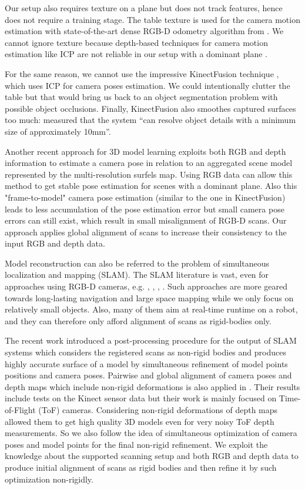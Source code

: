 \documentclass[letterpaper, 10 pt, conference]{ieeeconf}  %
\begin{document}
Our setup also requires 
texture on a plane but does not track features, hence does not require a training stage.
The table texture is used for the camera motion estimation 
with state-of-the-art dense RGB-D odometry algorithm from \cite{steinbrucker2011real}.
We cannot ignore texture because depth-based
techniques for camera motion estimation like ICP \cite{besl1992method} 
are not reliable in our setup with a dominant plane \cite{rusinkiewicz2001efficient}.


For the same reason, we cannot use
the impressive KinectFusion technique \cite{newcombe2011kinectfusion},
which uses ICP for camera poses estimation.
We could intentionally clutter the table but that would bring us back to
an object segmentation problem with possible object occlusions.
Finally, KinectFusion also smoothes captured surfaces too much: \cite{meister2012when} measured that
the system ``can resolve object details with a minimum size of approximately 10mm''.

Another recent approach \cite{stuckler2012model} for 3D model learning 
exploits both RGB and depth information to estimate a camera pose 
in relation to an aggregated scene model represented by the multi-resolution surfels map.
Using RGB data can allow this method to get stable pose estimation
for scenes with a dominant plane. Also this "frame-to-model" camera pose estimation (similar to the one in 
KinectFusion) leads to less accumulation of the pose estimation error
but small camera pose errors can still exist, which result in
small misalignment of RGB-D scans. Our approach applies global alignment of scans
to increase their consistency to the input RGB and depth data.

Model reconstruction can also be referred to the problem of simultaneous localization
and mapping (SLAM). The SLAM literature is vast, even for approaches using RGB-D
cameras, e.g. \cite{stuckler2012integrating},
\cite{endres2012evaluation}, \cite{henry2012rgb}, \cite{strasdat2011double}. Such approaches are more geared
towards long-lasting navigation and large space mapping while we only focus on relatively small objects.
Also, many of them aim at
real-time runtime on a robot, and they can therefore only afford alignment of scans 
as rigid-bodies only. 

The recent work \cite{ruhnke2012highly} introduced a post-processing procedure for the output of SLAM systems
which considers the registered scans as non-rigid bodies and produces highly accurate
surface of a model by simultaneous refinement of model points positions and camera poses.
Pairwise and global alignment of camera poses and depth maps which include non-rigid 
deformations is also applied in \cite{cui2012algorithms}. Their results include tests on the Kinect
sensor data but their work is mainly focused on Time-of-Flight (ToF) cameras. Considering non-rigid deformations 
of depth maps allowed them to get high quality 3D models even for very noisy ToF depth measurements.
So we also follow the idea of simultaneous optimization of camera poses and model points 
for the final non-rigid refinement. We exploit the knowledge 
about the supported scanning setup and both RGB and depth 
data to produce initial alignment of scans as rigid bodies
and then refine it by such optimization non-rigidly.
\end{document}
